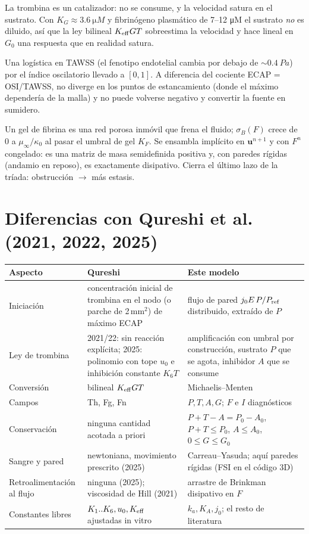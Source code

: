 \documentclass[11pt,a4paper]{article}
\newcommand{\bu}{\bm{u}}
\newcommand{\Pref}{P_{\rm ref}}
\begin{document}
\begin{description}[leftmargin=1.1em,style=nextline]
\item[Michaelis--Menten en la conversión.] La trombina es un catalizador: no se consume, y la velocidad satura en el sustrato. Con $K_G\approx\SI{3.6}{\micro M}$ y fibrinógeno plasmático de 7--12 \si{\micro M} el sustrato \emph{no} es diluido, así que la ley bilineal $K_{\rm eff}GT$ sobreestima la velocidad y hace lineal en $G_0$ una respuesta que en realidad satura.
\item[$E$ acotado y con umbral medido.] Una logística en TAWSS (el fenotipo endotelial cambia por debajo de $\sim\SI{0.4}{Pa}$) por el índice oscilatorio llevado a $[0,1]$. A diferencia del cociente ECAP = OSI/TAWSS, no diverge en los puntos de estancamiento (donde el máximo dependería de la malla) y no puede volverse negativo y convertir la fuente en sumidero.
\item[Brinkman en $F$, retrasado un paso.] Un gel de fibrina es una red porosa inmóvil que frena el fluido; $\sigma_B(F)$ crece de 0 a $\mu_\infty/\kappa_0$ al pasar el umbral de gel $K_F$. Se ensambla implícito en $\bu^{n+1}$ y con $F^n$ congelado: es una matriz de masa semidefinida positiva y, con paredes rígidas (andamio en reposo), es exactamente disipativo. Cierra el último lazo de la tríada: obstrucción $\to$ más estasis.
\end{description}

\section{Diferencias con Qureshi et al. (2021, 2022, 2025)}

\begin{center}\small
\begin{tabular}{@{}p{3.1cm}p{5.6cm}p{6.6cm}@{}}
\toprule
Aspecto & Qureshi & Este modelo \\
\midrule
Iniciación & concentración inicial de trombina en el nodo (o parche de 2\,mm$^2$) de máximo ECAP & flujo de pared $j_0E\,P/\Pref$ distribuido, extraído de $P$ \\
Ley de trombina & 2021/22: sin reacción explícita; 2025: polinomio con tope $u_0$ e inhibición constante $K_6T$ & amplificación con umbral por construcción, sustrato $P$ que se agota, inhibidor $A$ que se consume \\
Conversión & bilineal $K_{\rm eff}GT$ & Michaelis--Menten \\
Campos & Th, Fg, Fn & $P,T,A,G$; $F$ e $I$ diagnósticos \\
Conservación & ninguna cantidad acotada a priori & $P+T-A=P_0-A_0$, $P+T\le P_0$, $A\le A_0$, $0\le G\le G_0$ \\
Sangre y pared & newtoniana, movimiento prescrito (2025) & Carreau--Yasuda; aquí paredes rígidas (FSI en el código 3D) \\
Retroalimentación al flujo & ninguna (2025); viscosidad de Hill (2021) & arrastre de Brinkman disipativo en $F$ \\
Constantes libres & $K_1..K_6,u_0,K_{\rm eff}$ ajustadas in vitro & $k_a,K_A,j_0$; el resto de literatura \\
\bottomrule
\end{tabular}
\end{center}
\end{document}
